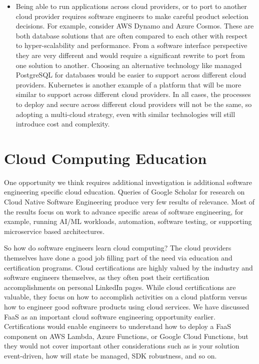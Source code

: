 \documentclass[conference]{IEEEconf}
\begin{document}
\begin{itemize}
	\item Being able to run applications across cloud providers, or to port to another cloud provider requires software engineers to make careful product selection decisions.  For example, consider AWS Dynamo and Azure Cosmos.  These are both database solutions that are often compared to each other with respect to hyper-scalability and performance.  From a software interface perspective they are very different and would require a significant rewrite to port from one solution to another.  Choosing an alternative technology like managed PostgreSQL for databases would be easier to support across different cloud providers.  Kubernetes is another example of a platform that will be more similar to support across different cloud providers.  In all cases, the processes to deploy and secure across different cloud providers will not be the same, so adopting a multi-cloud strategy, even with similar technologies will still introduce cost and complexity.
\end{itemize}  

\section{Cloud Computing Education}
One opportunity we think requires additional investigation is additional software engineering specific cloud education.  Queries of Google Scholar\cite{GoogleScolar} for research on Cloud Native Software Engineering produce very few results of relevance.  Most of the results focus on work to advance specific areas of software engineering, for example, running AI/ML workloads, automation, software testing, or supporting microservice based architectures.  

So how do software engineers learn cloud computing?  The cloud providers themselves have done a good job filling part of the need via education and certification programs.  Cloud certifications are highly valued by the industry and software engineers themselves, as they often post their certification accomplishments on personal LinkedIn pages. While cloud certifications are valuable, they focus on how to accomplish activities on a cloud platform versus how to engineer good software products using cloud services.  We have discussed FaaS as an important cloud software engineering opportunity earlier. Certifications would enable engineers to understand how to deploy a FaaS component on AWS Lambda, Azure Functions, or Google Cloud Functions, but they would not cover important other considerations such as is your solution event-driven, how will state be managed, SDK robustness, and so on.
\end{document}
